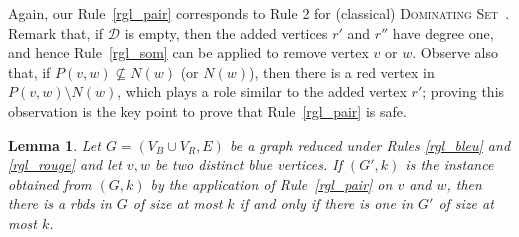 \documentclass[a4paper,11pt]{article}
\newtheorem{lem}  {Lemma}
\newcommand{\rrgl}   [1] {Rule~\ref{#1}\xspace}
\newcommand{\dom}    [0] {\textsc{Dominating Set}\xspace}
\newcommand{\drb}    [0] {rbds\xspace}
\begin{document}
Again, our \rrgl{rgl_pair} corresponds to Rule 2 for (classical) \dom~\cite{AFN04}. Remark that, if $\mathcal{D}$ is empty, then the added vertices $r'$ and $r''$ have degree one, and hence \rrgl{rgl_som} can be applied to remove vertex $v$ or $w$. Observe also that, if $P(v,w) \not \subseteq N(w)$ (or  $N(w)$), then there is a red vertex in $ P(v,w) \setminus N(w)$, which plays a role similar to the added vertex $r'$; proving this observation is the key point to prove that \rrgl{rgl_pair} is safe. \begin{lem} \label{lem_corr_2}
Let $G=(V_B\cup V_R,E)$ be a graph reduced under Rules \ref{rgl_bleu} and \ref{rgl_rouge} and let $v,w$ be two distinct blue vertices.
If $(G',k)$ is the instance obtained from $(G,k)$ by the application of \rrgl{rgl_pair} on $v$ and $w$,
then there is a \drb in $G$ of size at most $k$ if and only if there is one in $G'$ of size at most $k$.
\end{lem}
\end{document}
